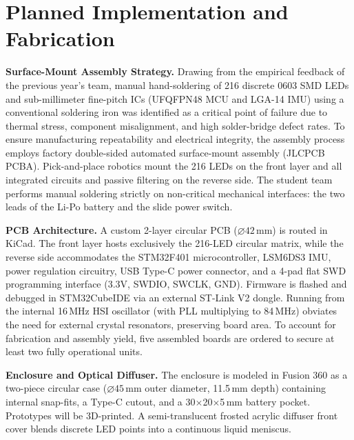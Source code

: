 \documentclass[conference]{IEEEtran}
\begin{document}
\section{Planned Implementation and Fabrication}

\textbf{Surface-Mount Assembly Strategy.} Drawing from the empirical feedback of the previous year's team, manual hand-soldering of 216 discrete 0603 SMD LEDs and sub-millimeter fine-pitch ICs (UFQFPN48 MCU and LGA-14 IMU) using a conventional soldering iron was identified as a critical point of failure due to thermal stress, component misalignment, and high solder-bridge defect rates. To ensure manufacturing repeatability and electrical integrity, the assembly process employs factory double-sided automated surface-mount assembly (JLCPCB PCBA). Pick-and-place robotics mount the 216 LEDs on the front layer and all integrated circuits and passive filtering on the reverse side. The student team performs manual soldering strictly on non-critical mechanical interfaces: the two leads of the Li-Po battery and the slide power switch.

\textbf{PCB Architecture.} A custom 2-layer circular PCB ($\varnothing 42$\,mm) is routed in KiCad. The front layer hosts exclusively the 216-LED circular matrix, while the reverse side accommodates the STM32F401 microcontroller, LSM6DS3 IMU, power regulation circuitry, USB Type-C power connector, and a 4-pad flat SWD programming interface (3.3V, SWDIO, SWCLK, GND). Firmware is flashed and debugged in STM32CubeIDE via an external ST-Link V2 dongle. Running from the internal 16\,MHz HSI oscillator (with PLL multiplying to 84\,MHz) obviates the need for external crystal resonators, preserving board area. To account for fabrication and assembly yield, five assembled boards are ordered to secure at least two fully operational units.

\textbf{Enclosure and Optical Diffuser.} The enclosure is modeled in Fusion 360 as a two-piece circular case ($\varnothing 45$\,mm outer diameter, 11.5\,mm depth) containing internal snap-fits, a Type-C cutout, and a 30$\times$20$\times$5\,mm battery pocket. Prototypes will be 3D-printed. A semi-translucent frosted acrylic diffuser front cover blends discrete LED points into a continuous liquid meniscus.

\end{document}
